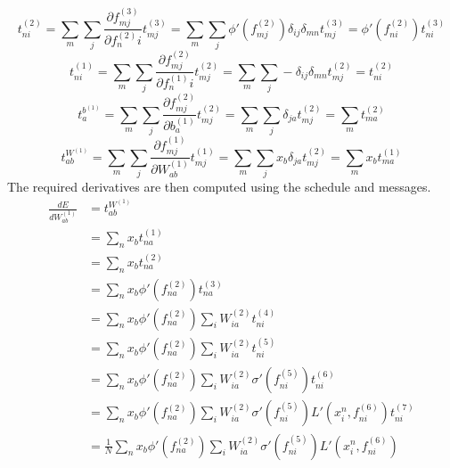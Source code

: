 \documentclass[fleqn]{report}
\begin{document}
\begin{equation}
    t^{(2)}_{ni} = \sum_m \sum_j \frac{\partial f^{(3)}_{mj}}{\partial f^{(2)}_ni} t^{(3)}_{mj} = \sum_m \sum_j \phi ' \left (f^{(2)}_{mj}\right) \delta_{ij} \delta_{mn} t^{(3)}_{mj} = \phi ' \left (f^{(2)}_{ni}\right) t^{(3)}_{ni}
\end{equation}
\begin{equation}
    t^{(1)}_{ni} = \sum_m \sum_j \frac{\partial f^{(2)}_{mj}}{\partial f^{(1)}_ni} t^{(2)}_{mj} = \sum_m \sum_j - \delta_{ij} \delta_{mn} t^{(2)}_{mj} = t^{(2)}_{ni}
\end{equation}
\begin{equation}
    t^{b^{(1)}}_{a} = \sum_m \sum_j \frac{\partial f^{(2)}_{mj}}{\partial b^{(1)}_a} t^{(2)}_{mj} = \sum_m \sum_j \delta_{ja} t^{(2)}_{mj} = \sum_m t^{(2)}_{ma}
\end{equation}
\begin{equation}
    t^{W^{(1)}}_{ab} = \sum_m \sum_j \frac{\partial f^{(1)}_{mj}}{\partial W^{(1)}_{ab}} t^{(1)}_{mj} = \sum_m \sum_j x_b \delta_{ja} t^{(2)}_{mj} =
    \sum_m x_b t^{(1)}_{ma}
\end{equation}
The required derivatives are then computed using the schedule and messages.
\begin{equation}
    \begin{split}
        \frac{d E}{d W^{(1)}_{ab}} & = t^{W^{(1)}}_{ab} \\
        & = \sum_n x_b t^{(1)}_{na} \\
        & = \sum_n x_b t^{(2)}_{na} \\
        & = \sum_n x_b \phi ' \left (f^{(2)}_{na}\right) t^{(3)}_{na} \\
        & = \sum_n x_b \phi ' \left (f^{(2)}_{na}\right) \sum_i W^{(2)}_{ia} t^{(4)}_{ni} \\
        & = \sum_n x_b \phi ' \left (f^{(2)}_{na}\right) \sum_i W^{(2)}_{ia} t^{(5)}_{ni} \\
        & = \sum_n x_b \phi ' \left (f^{(2)}_{na}\right) \sum_i W^{(2)}_{ia} \sigma'\left(f^{(5)}_{ni}\right) t^{(6)}_{ni} \\
        & = \sum_n x_b \phi ' \left (f^{(2)}_{na}\right) \sum_i W^{(2)}_{ia} \sigma'\left(f^{(5)}_{ni}\right) L'\left(x^n_i, f^{(6)}_{ni}\right) t^{(7)}_{ni} \\
        & = \frac{1}{N} \sum_n x_b \phi ' \left (f^{(2)}_{na}\right) \sum_i W^{(2)}_{ia} \sigma'\left(f^{(5)}_{ni}\right) L'\left(x^n_i, f^{(6)}_{ni}\right) \\
    \end{split}
\end{equation}
\end{document}
